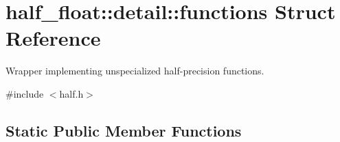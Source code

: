 \hypertarget{structhalf__float_1_1detail_1_1functions}{}\section{half\+\_\+float\+:\+:detail\+:\+:functions Struct Reference}
\label{structhalf__float_1_1detail_1_1functions}


Wrapper implementing unspecialized half-\/precision functions.  




{\ttfamily \#include $<$half.\+h$>$}

\subsection*{Static Public Member Functions}
